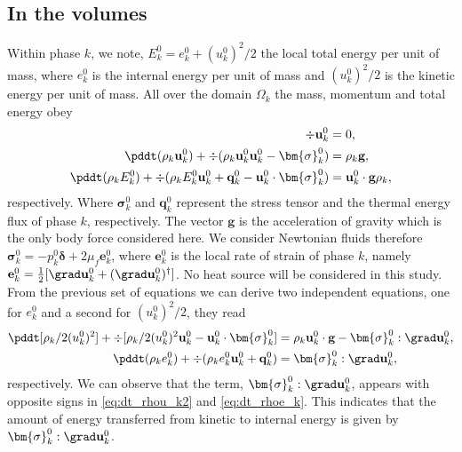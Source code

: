\subsection{In the volumes}
Within phase $k$, we note, $E_k^0 = e_k^0 + (u_k^0)^2/2$ the local total energy per unit of mass, where $e_k^0$ is the internal energy per unit of mass and $(u_k^0)^2/2$ is the kinetic energy per unit of mass.
All over the domain $\Omega_k$ the mass, momentum and total energy obey 
\begin{align}
    \label{eq:dt_rho}
    \div \textbf{u}_k^0
    &= 
    0,\\
    \label{eq:dt_rhou_k}
    \pddt (\rho_k\textbf{u}_k^0)  
    + \div (
        \rho_k\textbf{u}_k^0\textbf{u}_k^0
        - \bm{\sigma}_k^0 
    )
    &= 
    \rho_k \textbf{g},\\
    \label{eq:dt_rhoE_k}
    \pddt (\rho_kE_k^0)  
    + \div (
        \rho_kE_k^0\textbf{u}_k^0
        + \textbf{q}_k^0
        - \textbf{u}_k^0 \cdot \bm{\sigma}_k^0 
        )
    &= 
    \textbf{u}_k^0 \cdot \textbf{g}  \rho_k, 
\end{align} 
respectively. 
Where $\bm\sigma_k^0$ and $\textbf{q}_k^0$ represent the stress tensor and the thermal energy flux of phase $k$, respectively. 
The vector $\textbf{g}$ is the acceleration of gravity which is the only body force considered here.
We consider Newtonian fluids therefore $\bm\sigma_k^0 = -p_k^0\bm\delta + 2\mu_f \textbf{e}_k^0$, where $\textbf{e}_k^0$ is the local rate of strain of phase $k$, namely $\textbf{e}_k^0 = \frac{1}{2}[\grad \textbf{u}_k^0 + (\grad \textbf{u}_k^0)^\dagger]$. 
No heat source will be considered in this study. 
From the previous set of equations we can derive two independent equations, one for $e_k^0$ and a second for $(u_k^0)^2/2$, they read
\begin{align}
    \label{eq:dt_rhou_k2}
    \pddt [\rho_k/2(u_k^0)^2]  
    + \div [\rho_k/2(u_k^0)^2\textbf{u}_k^0 - \textbf{u}_k^0 \cdot \bm{\sigma}_k^0]
    &=
    \rho_k\textbf{u}_k^0 \cdot \textbf{g}  
    -  \bm{\sigma}_k^0 : \grad \textbf{u}_k^0,
    \\
    \label{eq:dt_rhoe_k}
    \pddt (\rho_ke_k^0)  
    + \div (
        \rho_ke_k^0\textbf{u}_k^0
        + \textbf{q}_k^0
        )
    &= 
    \bm{\sigma}_k^0 : \grad \textbf{u}_k^0,
\end{align} 
respectively. 
We can observe that the term, $\bm{\sigma}_k^0 : \grad \textbf{u}_k^0$,  appears with opposite signs in \ref{eq:dt_rhou_k2} and \ref{eq:dt_rhoe_k}.
This indicates that the amount of energy transferred from kinetic to internal energy is given by $\bm{\sigma}_k^0 : \grad \textbf{u}_k^0$.

